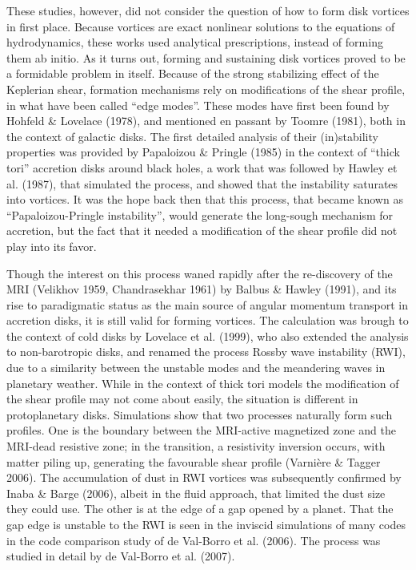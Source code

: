 \documentclass[apj]{emulateapj}
\begin{document}
These studies, however, did not consider the question of how to
form disk vortices in first place. Because vortices are exact nonlinear solutions to the equations of
hydrodynamics, these works used analytical prescriptions, instead of
forming them ab initio. As it turns out, forming and
sustaining disk vortices proved to be a formidable problem in
itself. Because of the strong stabilizing effect of the Keplerian
shear, formation mechanisms rely on modifications of the shear
profile, in what have been called ``edge modes''. These modes have
first been found by Hohfeld \& Lovelace (1978), and mentioned en
passant by Toomre (1981), both in the context of galactic disks. The first detailed analysis of their
(in)stability properties was provided by Papaloizou \& Pringle (1985) in the
context of ``thick tori'' accretion disks around
black holes, a work that was followed by Hawley et al. (1987), that
simulated the process, and showed that the instability saturates into
vortices. It was the hope back then that this process, that became
known as ``Papaloizou-Pringle instability'', would generate the
long-sough mechanism for accretion, but the fact that it needed a
modification of the shear profile did not play into its favor. 

Though the interest on this process waned rapidly after the re-discovery of the MRI
(Velikhov 1959, Chandrasekhar 1961) by Balbus \& Hawley (1991), and
its rise to paradigmatic status as the main source of angular momentum
transport in accretion disks, it is still valid for forming
vortices. The calculation was brough to the context of cold disks by
Lovelace et al. (1999), who also extended the analysis to
non-barotropic disks, and renamed the process Rossby wave instability
(RWI), due to a similarity between the unstable modes and the
meandering waves in planetary weather. While in the context of thick
tori models the modification of the shear profile may not come about
easily, the situation is different in protoplanetary
disks. Simulations show that two processes naturally form such
profiles. One is the boundary between the MRI-active magnetized zone
and the MRI-dead resistive zone; in the transition, a resistivity
inversion occurs, with matter piling up, generating the favourable
shear profile (Varni\`ere \& Tagger 2006). The accumulation of dust in
RWI vortices was subsequently confirmed by Inaba \& Barge (2006),
albeit in the fluid approach, that limited the dust size they could
use. The other is at the edge of a gap opened by a planet. That the
gap edge is unstable to the RWI is seen in the inviscid simulations 
of many codes in the code comparison study of de Val-Borro et
al. (2006). The process was studied in detail by de Val-Borro et al. (2007). 
\end{document}
